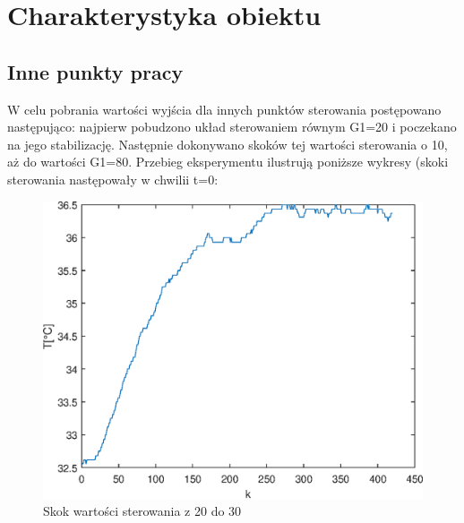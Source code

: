 \chapter {Charakterystyka obiektu}
\label{zad2l}

\section {Inne punkty pracy}

W celu pobrania wartości wyjścia dla innych punktów sterowania postępowano następująco: najpierw pobudzono układ sterowaniem równym G1=\num{20} i poczekano na jego stabilizację. Następnie dokonywano skoków tej wartości sterowania o 10, aż do wartości G1=\num{80}. Przebieg eksperymentu ilustrują poniższe wykresy (skoki sterowania następowały w chwilii t=\num{0}:



\begin{figure}[h!]
	\centering
	\includegraphics[scale=1]{Rys/Skok20_30.eps}
	\caption{Skok wartości sterowania z 20 do 30}
	\label{skok1}
\end{figure}

